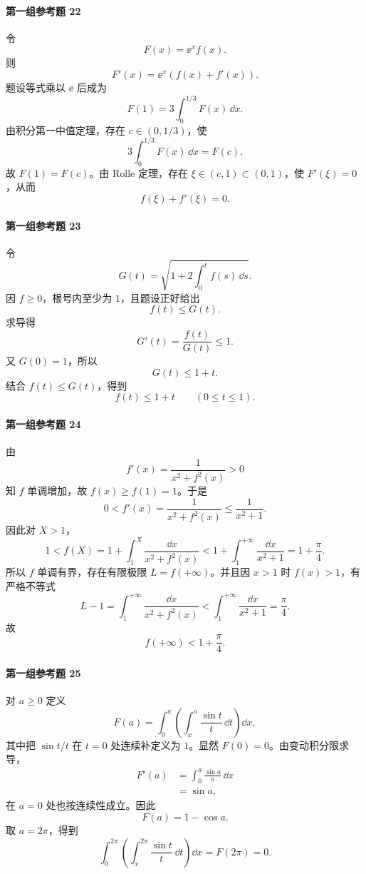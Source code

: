 \paragraph{第一组参考题 22}
\begin{xsolution}
令
\[
  F(x)=\ee^x f(x).
\]
则
\[
  F'(x)=\ee^x(f(x)+f'(x)).
\]
题设等式乘以 $\ee$ 后成为
\[
  F(1)=3\int_0^{1/3}F(x)\,\dd x.
\]
由积分第一中值定理，存在 $c\in(0,1/3)$，使
\[
  3\int_0^{1/3}F(x)\,\dd x=F(c).
\]
故 $F(1)=F(c)$。由 Rolle 定理，存在 $\xi\in(c,1)\subset(0,1)$，使 $F'(\xi)=0$，从而
\[
  \boxed{f(\xi)+f'(\xi)=0}.
\]
\end{xsolution}

\paragraph{第一组参考题 23}
\begin{xsolution}
令
\[
  G(t)=\sqrt{1+2\int_0^t f(s)\,\dd s}.
\]
因 $f\geqslant0$，根号内至少为 $1$，且题设正好给出
\[
  f(t)\leqslant G(t).
\]
求导得
\[
  G'(t)=\frac{f(t)}{G(t)}\leqslant1.
\]
又 $G(0)=1$，所以
\[
  G(t)\leqslant1+t.
\]
结合 $f(t)\leqslant G(t)$，得到
\[
  \boxed{f(t)\leqslant1+t\qquad(0\leqslant t\leqslant1)}.
\]
\end{xsolution}

\paragraph{第一组参考题 24}
\begin{xsolution}
由
\[
  f'(x)=\frac1{x^2+f^2(x)}>0
\]
知 $f$ 单调增加，故 $f(x)\geqslant f(1)=1$。于是
\[
  0<f'(x)=\frac1{x^2+f^2(x)}
  \leqslant\frac1{x^2+1}.
\]
因此对 $X>1$，
\[
  1<f(X)
  =1+\int_1^X\frac{\dd x}{x^2+f^2(x)}
  <1+\int_1^{+\infty}\frac{\dd x}{x^2+1}
  =1+\frac\pi4.
\]
所以 $f$ 单调有界，存在有限极限 $L=f(+\infty)$。并且因 $x>1$ 时 $f(x)>1$，有严格不等式
\[
  L-1=\int_1^{+\infty}\frac{\dd x}{x^2+f^2(x)}
  <\int_1^{+\infty}\frac{\dd x}{x^2+1}
  =\frac\pi4.
\]
故
\[
  \boxed{f(+\infty)<1+\frac\pi4}.
\]
\end{xsolution}

\paragraph{第一组参考题 25}
\begin{xsolution}
对 $a\geqslant0$ 定义
\[
  F(a)=\int_0^a\left(\int_x^a\frac{\sin t}{t}\,\dd t\right)\dd x,
\]
其中把 $\sin t/t$ 在 $t=0$ 处连续补定义为 $1$。显然 $F(0)=0$。由变动积分限求导，
\begin{align*}
  F'(a)
  &=\int_0^a\frac{\sin a}{a}\,\dd x\\
  &=\sin a,
\end{align*}
在 $a=0$ 处也按连续性成立。因此
\[
  F(a)=1-\cos a.
\]
取 $a=2\pi$，得到
\[
  \boxed{\int_0^{2\pi}\left(\int_x^{2\pi}\frac{\sin t}{t}\,\dd t\right)\dd x
  =F(2\pi)=0}.
\]
\end{xsolution}


